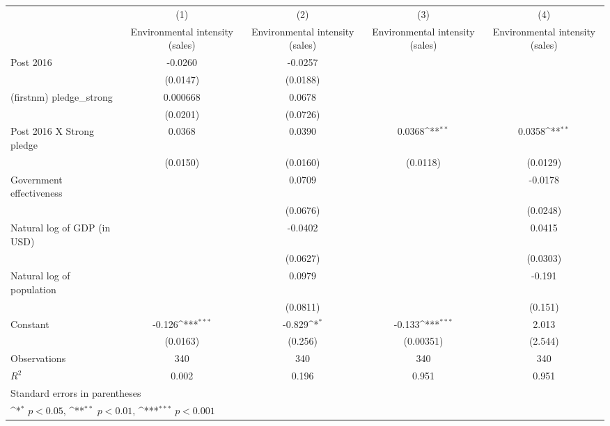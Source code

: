 {
\def\sym#1{\ifmmode^{#1}\else\(^{#1}\)\fi}
\begin{tabular}{l*{4}{c}}
\hline\hline
                    &\multicolumn{1}{c}{(1)}&\multicolumn{1}{c}{(2)}&\multicolumn{1}{c}{(3)}&\multicolumn{1}{c}{(4)}\\
                    &\multicolumn{1}{c}{Environmental intensity (sales)}&\multicolumn{1}{c}{Environmental intensity (sales)}&\multicolumn{1}{c}{Environmental intensity (sales)}&\multicolumn{1}{c}{Environmental intensity (sales)}\\
\hline
Post 2016           &     -0.0260         &     -0.0257         &                     &                     \\
                    &    (0.0147)         &    (0.0188)         &                     &                     \\
[1em]
(firstnm) pledge\_strong&    0.000668         &      0.0678         &                     &                     \\
                    &    (0.0201)         &    (0.0726)         &                     &                     \\
[1em]
Post 2016 X Strong pledge&      0.0368         &      0.0390         &      0.0368\sym{**} &      0.0358\sym{**} \\
                    &    (0.0150)         &    (0.0160)         &    (0.0118)         &    (0.0129)         \\
[1em]
Government effectiveness&                     &      0.0709         &                     &     -0.0178         \\
                    &                     &    (0.0676)         &                     &    (0.0248)         \\
[1em]
Natural log of GDP (in USD)&                     &     -0.0402         &                     &      0.0415         \\
                    &                     &    (0.0627)         &                     &    (0.0303)         \\
[1em]
Natural log of population&                     &      0.0979         &                     &      -0.191         \\
                    &                     &    (0.0811)         &                     &     (0.151)         \\
[1em]
Constant            &      -0.126\sym{***}&      -0.829\sym{*}  &      -0.133\sym{***}&       2.013         \\
                    &    (0.0163)         &     (0.256)         &   (0.00351)         &     (2.544)         \\
\hline
Observations        &         340         &         340         &         340         &         340         \\
\(R^{2}\)           &       0.002         &       0.196         &       0.951         &       0.951         \\
\hline\hline
\multicolumn{5}{l}{\footnotesize Standard errors in parentheses}\\
\multicolumn{5}{l}{\footnotesize \sym{*} \(p<0.05\), \sym{**} \(p<0.01\), \sym{***} \(p<0.001\)}\\
\end{tabular}
}
